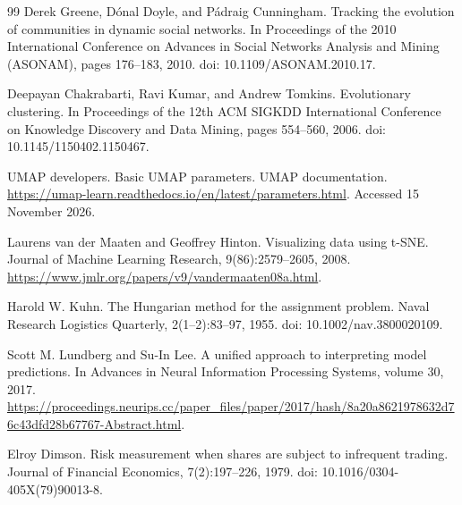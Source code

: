 \begin{thebibliography}{99}
 Derek Greene, D\'{o}nal Doyle, and P\'{a}draig Cunningham. Tracking the evolution of communities in dynamic social networks. In Proceedings of the 2010 International Conference on Advances in Social Networks Analysis and Mining (ASONAM), pages 176--183, 2010. doi: 10.1109/ASONAM.2010.17.

 Deepayan Chakrabarti, Ravi Kumar, and Andrew Tomkins. Evolutionary clustering. In Proceedings of the 12th ACM SIGKDD International Conference on Knowledge Discovery and Data Mining, pages 554--560, 2006. doi: 10.1145/1150402.1150467.

 UMAP developers. Basic UMAP parameters. UMAP documentation. \url{https://umap-learn.readthedocs.io/en/latest/parameters.html}. Accessed 15 November 2026.

 Laurens van der Maaten and Geoffrey Hinton. Visualizing data using t-SNE. Journal of Machine Learning Research, 9(86):2579--2605, 2008. \url{https://www.jmlr.org/papers/v9/vandermaaten08a.html}.

 Harold W. Kuhn. The Hungarian method for the assignment problem. Naval Research Logistics Quarterly, 2(1--2):83--97, 1955. doi: 10.1002/nav.3800020109.

 Scott M. Lundberg and Su-In Lee. A unified approach to interpreting model predictions. In Advances in Neural Information Processing Systems, volume 30, 2017. \url{https://proceedings.neurips.cc/paper_files/paper/2017/hash/8a20a8621978632d76c43dfd28b67767-Abstract.html}.

 Elroy Dimson. Risk measurement when shares are subject to infrequent trading. Journal of Financial Economics, 7(2):197--226, 1979. doi: 10.1016/0304-405X(79)90013-8.

\end{thebibliography}
